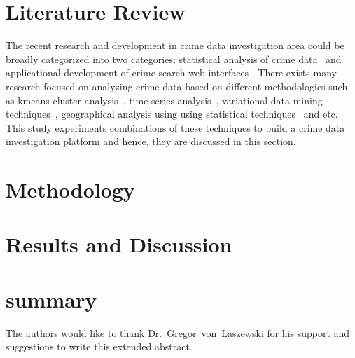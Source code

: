 \section{Literature Review}
The recent research and development in crime data investigation area could
be broadly categorized into two categories; statistical analysis of
crime data~\cite{hid-sp18-409-agarwal2013crime, hid-sp18-409-bharathi2014survey, hid-sp18-409-kiani2015analysis, hid-sp18-409-nath2006crime, hid-sp18-409-gera2014city} and applicational development of crime search web interfaces \cite{hid-sp18-409-www-spotcrime, hid-sp18-409-www-crimereports, hid-sp18-409-www-mylocalcrime, hid-sp18-409-www-crimemapping}. There exists many research focused on analyzing crime data based on different methodologies such as kmeans cluster analysis~\cite{hid-sp18-409-gera2014city, hid-sp18-409-nath2006crime, hid-sp18-409-agarwal2013crime}, time series analysis~\cite{hid-sp18-409-wei2006time}, variational data mining techniques~\cite{hid-sp18-409-chen2004crime}, geographical analysis using 
using statistical techniques~\cite{hid-sp18-409-santos2016crime} and etc. This study experiments combinations of these techniques to build a crime data investigation platform and hence, they are discussed in this section.

\section{Methodology}

\section{Results and Discussion}

\section{summary} 

\begin{acks}
	
The authors would like to thank Dr.~Gregor~von~Laszewski for his
support and suggestions to write this extended abstract.
	
\end{acks}


 
